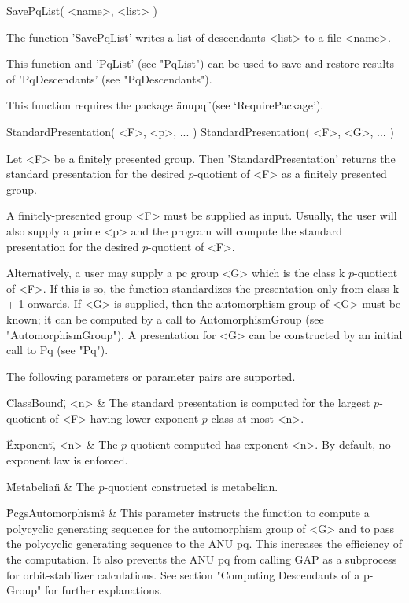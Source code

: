 \>SavePqList( <name>, <list> )

The function 'SavePqList' writes a list of  descendants  <list> to a file
<name>.

This function and 'PqList' (see "PqList") can be used to save and restore
results of 'PqDescendants' (see "PqDescendants").

This function requires the package \"anupq\"\ (see `RequirePackage').


\>StandardPresentation( <F>, <p>, ...  )
\>StandardPresentation( <F>, <G>, ...  )

Let  <F> be  a  finitely  presented group.   Then  'StandardPresentation'
returns the standard presentation for the  desired $p$-quotient of <F> as
a finitely presented group.

A  finitely-presented group <F> must be  supplied  as input. Usually, the
user will  also  supply a prime  <p> and  the  program will  compute  the
standard presentation for the desired $p$-quotient of <F>.

Alternatively, a  user may  supply a pc  group <G>  which is the  class k
$p$-quotient  of <F>.   If  this  is so,  the  function standardizes  the
presentation only from class k +  1 onwards. If <G> is supplied, then the
automorphism group of <G> must be known;  it can be computed by a call to
AutomorphismGroup (see "AutomorphismGroup").   A presentation for <G> can
be constructed by an initial call to Pq (see "Pq").

The following parameters or parameter pairs are supported.

\beginitems
\"ClassBound\", <n> &
    The  standard presentation is  computed for  the largest $p$-quotient
    of <F> having lower exponent-$p$ class at most <n>.

\"Exponent\", <n> &
    The $p$-quotient computed has  exponent <n>.  By default, no exponent
    law is enforced.

\"Metabelian\" &
    The $p$-quotient constructed is metabelian.

\"PcgsAutomorphisms\" &
    This  parameter  instructs  the  function  to  compute  a  polycyclic
    generating sequence for the automorphism group of <G> and to pass the
    polycyclic  generating sequence to  the ANU  pq.  This  increases the
    efficiency  of the  computation.  It  also prevents  the ANU  pq from
    calling GAP  as a subprocess for  orbit-stabilizer calculations.  See
    section   "Computing   Descendants   of   a  p-Group"   for   further
    explanations.


